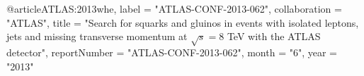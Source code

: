 @article{ATLAS:2013whe,
    label = "ATLAS-CONF-2013-062",
    collaboration = "ATLAS",
    title = "{Search for squarks and gluinos in events with isolated leptons, jets and missing transverse momentum at $\sqrt{s}=8$ TeV with the ATLAS detector}",
    reportNumber = "ATLAS-CONF-2013-062",
    month = "6",
    year = "2013"
}


